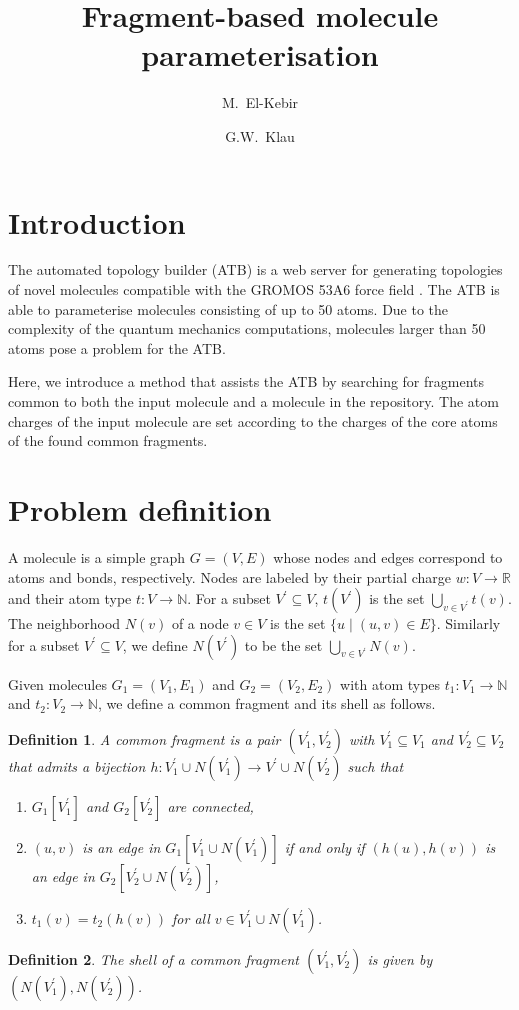 \documentclass[11pt]{article}
\author{M.~El-Kebir \and  G.W.~Klau}
\title{Fragment-based molecule parameterisation}
\newtheorem{definition}{Definition}[section]
\begin{document}
\maketitle

\section{Introduction}

The automated topology builder (ATB) is a web server for generating topologies
of novel molecules compatible with the GROMOS 53A6 force field \cite{Malde11}.
The ATB is able to parameterise molecules consisting of up to 50 atoms. Due to
the complexity of the quantum mechanics computations, molecules larger than 50
atoms pose a problem for the ATB. 

Here, we introduce a method that assists the ATB by searching for fragments
common to both the input molecule and a molecule in the repository. The atom
charges of the input molecule are set according to the charges of the core atoms
of the found common fragments.

\section{Problem definition}

A molecule is a simple graph $G=(V,E)$ whose nodes and edges correspond to atoms
and bonds, respectively. Nodes are labeled by their partial charge $w : V
\rightarrow \mathbb{R}$ and their atom type $t : V \rightarrow \mathbb{N}$. 
For a subset $V^\prime \subseteq V$, $t(V^\prime)$ is the set $\bigcup_{v \in
V^\prime} t(v)$. The neighborhood $N(v)$ of a node $v \in V$ is the set $\{ u
\mid (u,v) \in E \}$. Similarly for a subset $V^\prime \subseteq V$, we define
$N(V^\prime)$ to be the set $\bigcup_{v \in V^\prime} N(v)$. 

Given molecules $G_1 = (V_1, E_1)$ and $G_2 = (V_2, E_2)$ with atom types $t_1 :
V_1 \rightarrow \mathbb{N}$ and $t_2 : V_2 \rightarrow \mathbb{N}$, we define a
common fragment and its shell as follows.

\begin{definition}
  A \emph{common fragment} is a pair $(V^\prime_1, V^\prime_2)$ with $V^\prime_1
  \subseteq V_1$ and $V^\prime_2 \subseteq V_2$ that admits a bijection $h :
  V^\prime_1 \cup N(V^\prime_1) \rightarrow V^\prime \cup N(V^\prime_2)$ such
  that
  \begin{enumerate}
    \item[(i)] $G_1[V^\prime_1]$ and $G_2[V^\prime_2]$ are connected,
    \item[(ii)] $(u,v)$ is an edge in $G_1[V^\prime_1 \cup N(V^\prime_1)]$ if and
      only if $(h(u),h(v))$ is an edge in $G_2[V^\prime_2 \cup N(V^\prime_2)]$,
    \item[(iii)] $t_1(v) = t_2(h(v))$ for all $v \in V^\prime_1 \cup
      N(V^\prime_1)$.
  \end{enumerate}
\end{definition}
\begin{definition}
  The \emph{shell} of a common fragment $(V^\prime_1, V^\prime_2)$ is given
  by $(N(V^\prime_1), N(V^\prime_2))$.
\end{definition}
\end{document}

